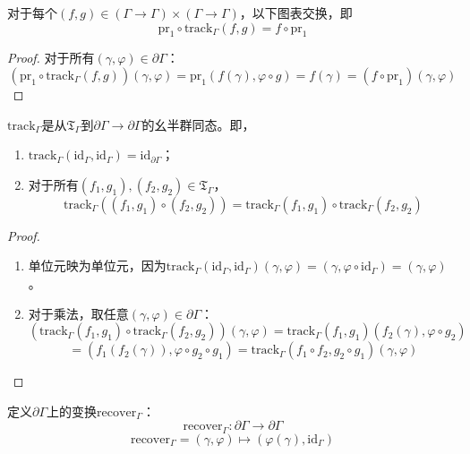 \begin{theorem}\label{thm:3.4}
对于每个$(f, g) \in (\Gamma \to \Gamma) \times (\Gamma \to \Gamma)$，以下图表交换，即
\begin{equation}\label{eq:3.7}
\mathrm{pr}_1 \circ \mathrm{track}_\Gamma(f, g) = f \circ \mathrm{pr}_1
\end{equation}
\end{theorem}

\begin{proof}
对于所有$(\gamma, \varphi) \in \partial\Gamma$：
\[
(\mathrm{pr}_1 \circ \mathrm{track}_\Gamma(f, g))(\gamma, \varphi) = \mathrm{pr}_1(f(\gamma), \varphi \circ g) = f(\gamma) = (f \circ \mathrm{pr}_1)(\gamma, \varphi)
\]
\end{proof}

\begin{theorem}\label{thm:3.5}
$\mathrm{track}_\Gamma$是从$\mathfrak{T}_\Gamma$到$\partial\Gamma \to \partial\Gamma$的幺半群同态。即，
\begin{enumerate}
\item $\mathrm{track}_\Gamma(\mathrm{id}_\Gamma, \mathrm{id}_\Gamma) = \mathrm{id}_{\partial\Gamma}$；
\item 对于所有$(f_1, g_1), (f_2, g_2) \in \mathfrak{T}_\Gamma$，
\begin{equation}\label{eq:3.8}
\mathrm{track}_\Gamma((f_1, g_1) \circ (f_2, g_2)) = \mathrm{track}_\Gamma(f_1, g_1) \circ \mathrm{track}_\Gamma(f_2, g_2)
\end{equation}
\end{enumerate}
\end{theorem}

\begin{proof}
\begin{enumerate}
\item 单位元映为单位元，因为$\mathrm{track}_\Gamma(\mathrm{id}_\Gamma, \mathrm{id}_\Gamma)(\gamma, \varphi) = (\gamma, \varphi \circ \mathrm{id}_\Gamma) = (\gamma, \varphi)$。
\item 对于乘法，取任意$(\gamma, \varphi) \in \partial\Gamma$：
\[
(\mathrm{track}_\Gamma(f_1, g_1) \circ \mathrm{track}_\Gamma(f_2, g_2))(\gamma, \varphi) = \mathrm{track}_\Gamma(f_1, g_1)(f_2(\gamma), \varphi \circ g_2)
\]
\[
= (f_1(f_2(\gamma)), \varphi \circ g_2 \circ g_1) = \mathrm{track}_\Gamma(f_1 \circ f_2, g_2 \circ g_1)(\gamma, \varphi)
\]
\end{enumerate}
\end{proof}

\begin{definition}\label{def:3.6}
定义$\partial\Gamma$上的变换$\mathrm{recover}_\Gamma$：
\begin{equation}\label{eq:3.9}
\mathrm{recover}_\Gamma : \partial\Gamma \to \partial\Gamma
\end{equation}
\[
\mathrm{recover}_\Gamma = (\gamma, \varphi) \mapsto (\varphi(\gamma), \mathrm{id}_\Gamma)
\]
\end{definition}

